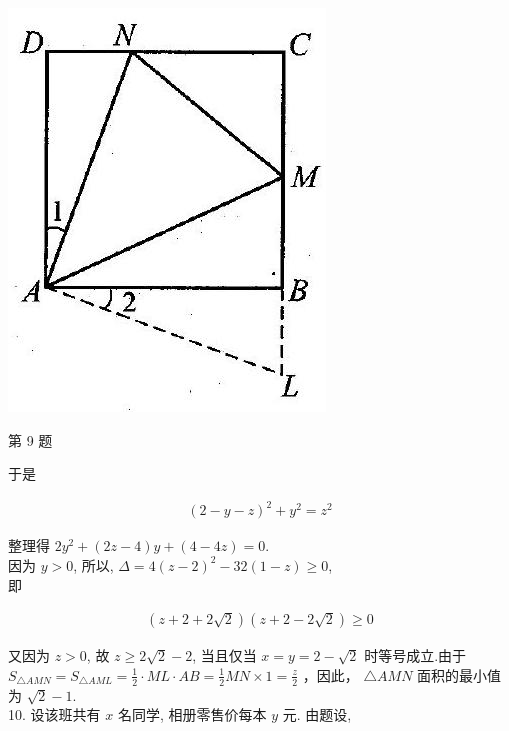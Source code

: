\documentclass[10pt]{article}
\begin{document}
\begin{center}
\includegraphics[max width=\textwidth]{2024_10_30_26b590fd1106d28139f0g-151(1)}
\end{center}

第 9 题

于是

\begin{align*}
(2-y-z)^{2}+y^{2}=z^{2}
\end{align*}

整理得 $2 y^{2}+(2 z-4) y+(4-4 z)=0$.\\
因为 $y>0$, 所以, $\Delta=4(z-2)^{2}-32(1-z) \geqslant 0$,\\
即

\begin{align*}
(z+2+2 \sqrt{2})(z+2-2 \sqrt{2}) \geqslant 0
\end{align*}

又因为 $z>0$, 故 $z \geqslant 2 \sqrt{2}-2$, 当且仅当 $x=y=2-\sqrt{2}$ 时等号成立.由于 $S_{\triangle A M N}=S_{\triangle A M L}=\frac{1}{2} \cdot M L \cdot A B=\frac{1}{2} M N \times 1=\frac{z}{2}$ ，因此， $\triangle A M N$ 面积的最小值为 $\sqrt{2}-1$.\\
10. 设该班共有 $x$ 名同学, 相册零售价每本 $y$ 元. 由题设,
\end{document}

